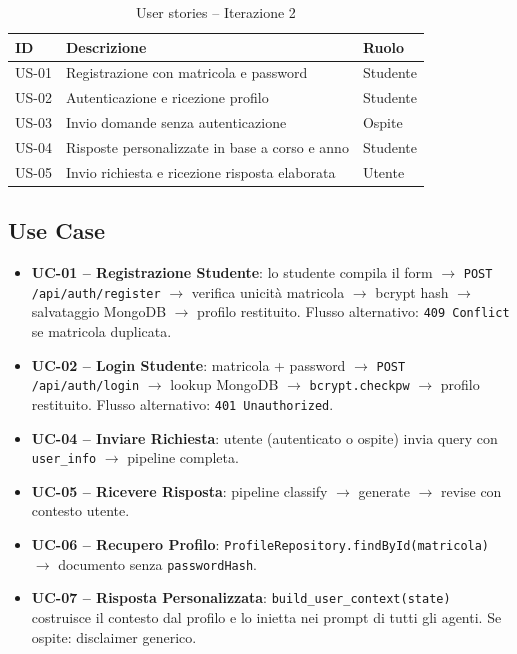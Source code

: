 \documentclass[a4paper,12pt]{report}
\begin{document}
\begin{table}[H]
\centering
\begin{tabularx}{\textwidth}{l X l}
\toprule
\textbf{ID} & \textbf{Descrizione} & \textbf{Ruolo} \\
\midrule
US-01 & Registrazione con matricola e password & Studente \\
US-02 & Autenticazione e ricezione profilo & Studente \\
US-03 & Invio domande senza autenticazione & Ospite \\
US-04 & Risposte personalizzate in base a corso e anno & Studente \\
US-05 & Invio richiesta e ricezione risposta elaborata & Utente \\
\bottomrule
\end{tabularx}
\caption{User stories -- Iterazione 2}
\end{table}

\subsection{Use Case}

\begin{itemize}
    \item \textbf{UC-01 -- Registrazione Studente}: lo studente compila il form $\rightarrow$ \texttt{POST /api/auth/register} $\rightarrow$ verifica unicità matricola $\rightarrow$ bcrypt hash $\rightarrow$ salvataggio MongoDB $\rightarrow$ profilo restituito. Flusso alternativo: \texttt{409 Conflict} se matricola duplicata.

    \item \textbf{UC-02 -- Login Studente}: matricola + password $\rightarrow$ \texttt{POST /api/auth/login} $\rightarrow$ lookup MongoDB $\rightarrow$ \texttt{bcrypt.checkpw} $\rightarrow$ profilo restituito. Flusso alternativo: \texttt{401 Unauthorized}.

    \item \textbf{UC-04 -- Inviare Richiesta}: utente (autenticato o ospite) invia query con \texttt{user\_info} $\rightarrow$ pipeline completa.

    \item \textbf{UC-05 -- Ricevere Risposta}: pipeline classify $\rightarrow$ generate $\rightarrow$ revise con contesto utente.

    \item \textbf{UC-06 -- Recupero Profilo}: \texttt{ProfileRepository.findById(matricola)} $\rightarrow$ documento senza \texttt{passwordHash}.

    \item \textbf{UC-07 -- Risposta Personalizzata}: \texttt{build\_user\_context(state)} costruisce il contesto dal profilo e lo inietta nei prompt di tutti gli agenti. Se ospite: disclaimer generico.
\end{itemize}
\end{document}
